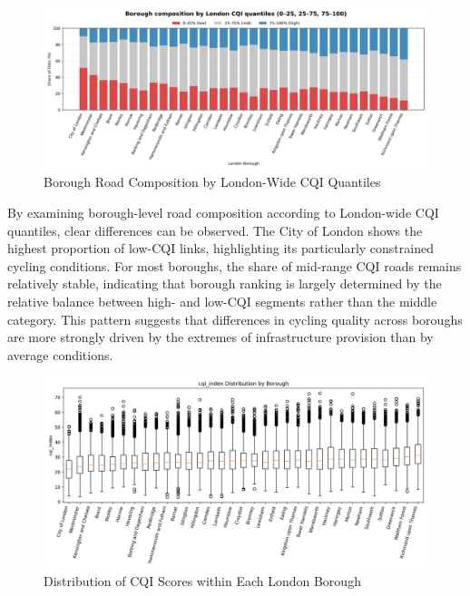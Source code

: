 \documentclass[
  12pt,
  oneside]{book}
\begin{document}
\begin{figure}

{\centering \includegraphics[width=1\linewidth]{general_images/BoroughComposition} 

}

\caption{Borough Road Composition by London-Wide CQI Quantiles}\label{fig:BoroughComposition}
\end{figure}

By examining borough-level road composition according to London-wide CQI quantiles, clear differences can be observed. The City of London shows the highest proportion of low-CQI links, highlighting its particularly constrained cycling conditions. For most boroughs, the share of mid-range CQI roads remains relatively stable, indicating that borough ranking is largely determined by the relative balance between high- and low-CQI segments rather than the middle category. This pattern suggests that differences in cycling quality across boroughs are more strongly driven by the extremes of infrastructure provision than by average conditions.

\begin{figure}

{\centering \includegraphics[width=1\linewidth]{general_images/box_cqi_by_borough} 

}

\caption{Distribution of CQI Scores within Each London Borough}\label{fig:boxcqiborough}
\end{figure}
\end{document}
